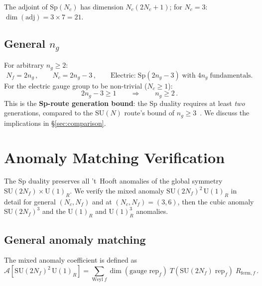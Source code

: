 \documentclass[11pt,a4paper]{article}
\theoremstyle{plain}
\theoremstyle{definition}
\theoremstyle{remark}
\newcommand{\Nc}{N_{\!c}}
\newcommand{\Nf}{N_{\!f}}
\newcommand{\SU}[1]{\mathrm{SU}(#1)}
\newcommand{\UU}[1]{\mathrm{U}(#1)}
\newcommand{\Sp}[1]{\mathrm{Sp}(#1)}
\newcommand{\adj}{\mathrm{adj}}
\begin{document}
The adjoint of $\Sp{\Nc}$ has dimension $\Nc(2\Nc + 1)$; for
$\Nc = 3$: $\dim(\adj) = 3 \times 7 = 21$.

\subsection{General $n_g$}

For arbitrary $n_g \geq 2$:
\begin{equation}\label{eq:general-electric}
  \Nf = 2n_g\,,
  \qquad
  \Nc = 2n_g - 3\,,
  \qquad
  \text{Electric:}\; \Sp{2n_g - 3}\; \text{with}\; 4n_g\;
  \text{fundamentals.}
\end{equation}
For the electric gauge group to be non-trivial ($\Nc \geq 1$):
\begin{equation}\label{eq:Sp-gen-bound}
  2n_g - 3 \geq 1
  \qquad\Longrightarrow\qquad
  \boxed{n_g \geq 2\,.}
\end{equation}
This is the \textbf{Sp-route generation bound}: the Sp duality
requires at least \emph{two} generations, compared to the $\SU{N}$
route's bound of $n_g \geq 3$~\cite{Sannino2011}.  We discuss the
implications in \S\ref{sec:comparison}.


\section{Anomaly Matching Verification}
\label{sec:anomaly-matching}

The Sp duality preserves all 't~Hooft anomalies of the global
symmetry $\SU{2\Nf} \times \UU{1}_R$.  We verify the mixed anomaly
$\SU{2\Nf}^2\,\UU{1}_R$ in detail for general $(\Nc, \Nf)$ and at
$(\Nc, \Nf) = (3, 6)$, then the cubic anomaly $\SU{2\Nf}^3$ and the
$\UU{1}_R$ and $\UU{1}_R^3$ anomalies.

\subsection{General anomaly matching}

The mixed anomaly coefficient is defined as
\begin{equation}\label{eq:anomaly-def}
  \mathcal{A}[\SU{2\Nf}^2\,\UU{1}_R]
  = \sum_{\text{Weyl}\;f} \dim(\text{gauge rep}_f)\;
    T(\text{SU}(2\Nf)\;\text{rep}_f)\; R_{\mathrm{ferm},f}\,.
\end{equation}
\end{document}
